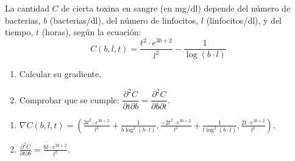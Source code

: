 {La cantidad $C$ de cierta toxina en sangre (en mg/dl) depende del número de bacterias, $b$ (bacterias/dl), del número de linfocitos, $l$ (linfocitos/dl), y del tiempo, $t$ (horas), según la ecuación:
\[
C(b,l,t) = \frac{{t^2  \cdot e^{3b + 2} }}{{l^2 }} - \frac{1}{{\log
(b \cdot l)}}
\]
\begin{enumerate}
\item Calcular su gradiente.

\item Comprobar que se cumple: $\dfrac{{\partial ^2 C}}{{\partial t\partial b}} = \dfrac{{\partial ^2 C}}{{\partial b\partial t}}$.
\end{enumerate}
}
{
\begin{enumerate}
\item $\nabla C(b,l,t)=\left( \frac{{3t^2 \cdot e^{3b + 2} }}{{l^2 }}+\frac{1}{{b\log^2
(b \cdot l)}}, \frac{{-2t^2 \cdot e^{3b + 2} }}{{l^3 }}+\frac{1}{{l\log^2
(b \cdot l)}}, \frac{{2t \cdot e^{3b + 2} }}{{l^2 }} \right)$.

\item $\frac{\partial ^2 C}{\partial t \partial b}  = \frac{{6t \cdot e^{3b + 2} }}{{l^2 }}$. 
\end{enumerate}
}
